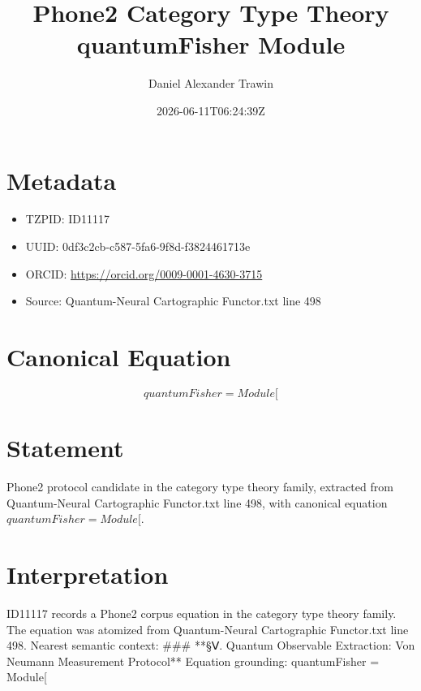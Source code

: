 \documentclass[11pt]{article}
\title{Phone2 Category Type Theory quantumFisher Module}
\author{Daniel Alexander Trawin}
\date{2026-06-11T06:24:39Z}
\begin{document}
\maketitle
\section*{Metadata}
\begin{itemize}
\item TZPID: ID11117
\item UUID: 0df3c2cb-c587-5fa6-9f8d-f3824461713e
\item ORCID: \url{https://orcid.org/0009-0001-4630-3715}
\item Source: Quantum-Neural Cartographic Functor.txt line 498
\end{itemize}
\section*{Canonical Equation}
\[
quantumFisher = Module[
\]
\section*{Statement}
Phone2 protocol candidate in the category type theory family, extracted from Quantum-Neural Cartographic Functor.txt line 498, with canonical equation $quantumFisher = Module[$.
\section*{Interpretation}
ID11117 records a Phone2 corpus equation in the category type theory family. The equation was atomized from Quantum-Neural Cartographic Functor.txt line 498. Nearest semantic context: ### **§Ⅴ. Quantum Observable Extraction: Von Neumann Measurement Protocol** Equation grounding: quantumFisher = Module[
\end{document}
